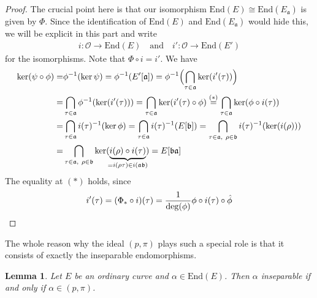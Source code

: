 \documentclass{ociamthesis}
\newcommand{\End}{\mathrm{End}}
\renewcommand{\a}{\mathfrak{a}}
\renewcommand{\b}{\mathfrak{b}}
\renewcommand{\O}{\mathcal{O}}
\newtheorem{lemma}[prop]{Lemma}
\theoremstyle{definition}
\begin{document}
\begin{proof}
    The crucial point here is that our isomorphism $\End(E) \cong \End(E_\a)$ is given by $\Phi$.
    Since the identification of $\End(E)$ and $\End(E_\a)$ would hide this, we will be explicit in this part and write
    \begin{align*}
        i: \O \to \End(E) \quad \text{and} \quad i': \O \to \End(E')
    \end{align*}
    for the isomorphisms.
    Note that $\Phi \circ i = i'$.
    We have
    \begin{align*}
        \ker(\psi \circ \phi) =& \phi^{-1}(\ker\psi) = \phi^{-1}(E'[\mathfrak{a}]) = \phi^{-1}\Bigl( \bigcap_{\tau \in \mathfrak{a}} \ker(i'(\tau)) \Bigr) \\
        =& \bigcap_{\tau \in \mathfrak{a}} \phi^{-1}(\ker(i'(\tau))) = \bigcap_{\tau \in \mathfrak{a}} \ker(i'(\tau) \circ \phi) \overset{(*)}{=} \bigcap_{\tau \in \mathfrak{a}} \ker(\phi \circ i(\tau)) \\
        =& \bigcap_{\tau \in \mathfrak{a}} i(\tau)^{-1}(\ker\phi) = \bigcap_{\tau \in \mathfrak{a}} i(\tau)^{-1}(E[\mathfrak{b}]) = \bigcap_{\tau \in \mathfrak{a}, \ \rho \in \mathfrak{b}} i(\tau)^{-1}(\ker(i(\rho))) \\
        =& \bigcap_{\tau \in \mathfrak{a}, \ \rho \in \mathfrak{b}} \ker(\underbrace{i(\rho) \circ i(\tau)}_{\mathclap{= i(\rho\tau) \in i(\a\b)}}) = E[\mathfrak{b}\mathfrak{a}]
    \end{align*}
    The equality at $(*)$ holds, since
    \begin{equation*}
        i'(\tau) = (\Phi_* \circ i)(\tau) = \frac 1 {\deg(\phi)} \phi \circ i(\tau) \circ \hat{\phi} \qedhere
    \end{equation*}
\end{proof}
The whole reason why the ideal $(p, \pi)$ plays such a special role is that it consists of exactly the inseparable endomorphisms.
\begin{lemma}
    \label{prop:inseparable_iff_frobenius_ideal}
    Let $E$ be an ordinary curve and $\alpha \in \End(E)$.
    Then $\alpha$ inseparable if and only if $\alpha \in (p, \pi)$.
\end{lemma}
\end{document}
